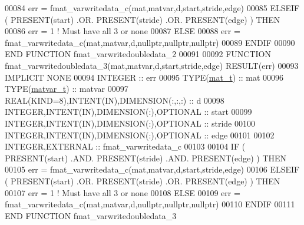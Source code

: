 \begin{DoxyCode}
00084         err = fmat\_varwritedata\_c(mat,matvar,d,start,stride,edge)
00085     \textcolor{keywordflow}{ELSEIF} ( \textcolor{keyword}{PRESENT}(start) .OR. \textcolor{keyword}{PRESENT}(stride) .OR. \textcolor{keyword}{PRESENT}(edge) ) \textcolor{keywordflow}{THEN}
00086         err = 1    \textcolor{comment}{! Must have all 3 or none}
00087     \textcolor{keywordflow}{ELSE}
00088         err = fmat\_varwritedata\_c(mat,matvar,d,nullptr,nullptr,nullptr)
00089 \textcolor{keywordflow}{    ENDIF}
00090 \textcolor{keyword}{END FUNCTION }fmat\_varwritedoubledata\_2
00091 
00092 \textcolor{keyword}{FUNCTION }fmat\_varwritedoubledata\_3(mat,matvar,d,start,stride,edge) \textcolor{keyword}{RESULT}(err)
00093 \textcolor{keywordtype}{IMPLICIT NONE}
00094     \textcolor{keywordtype}{INTEGER}                                  :: err
00095     \textcolor{keywordtype}{TYPE}(\hyperlink{group___m_a_t_gab0fc888f5a5d79943b16284b1f91c2e8}{mat\_t})                              :: mat
00096     \textcolor{keywordtype}{TYPE}(\hyperlink{group___m_a_t_structmatvar__t}{matvar\_t})                           :: matvar
00097     \textcolor{keywordtype}{REAL(KIND=8)},\textcolor{keywordtype}{INTENT(IN)},\textcolor{keywordtype}{DIMENSION(:,:,:)} :: d
00098     \textcolor{keywordtype}{INTEGER},\textcolor{keywordtype}{INTENT(IN)},\textcolor{keywordtype}{DIMENSION(:)},\textcolor{keywordtype}{OPTIONAL} :: start
00099     \textcolor{keywordtype}{INTEGER},\textcolor{keywordtype}{INTENT(IN)},\textcolor{keywordtype}{DIMENSION(:)},\textcolor{keywordtype}{OPTIONAL} :: stride
00100     \textcolor{keywordtype}{INTEGER},\textcolor{keywordtype}{INTENT(IN)},\textcolor{keywordtype}{DIMENSION(:)},\textcolor{keywordtype}{OPTIONAL} :: edge
00101 
00102     \textcolor{keywordtype}{INTEGER},\textcolor{keywordtype}{EXTERNAL}                         :: fmat\_varwritedata\_c
00103 
00104     \textcolor{keywordflow}{IF} ( \textcolor{keyword}{PRESENT}(start) .AND. \textcolor{keyword}{PRESENT}(stride) .AND. \textcolor{keyword}{PRESENT}(edge) ) \textcolor{keywordflow}{THEN}
00105         err = fmat\_varwritedata\_c(mat,matvar,d,start,stride,edge)
00106     \textcolor{keywordflow}{ELSEIF} ( \textcolor{keyword}{PRESENT}(start) .OR. \textcolor{keyword}{PRESENT}(stride) .OR. \textcolor{keyword}{PRESENT}(edge) ) \textcolor{keywordflow}{THEN}
00107         err = 1    \textcolor{comment}{! Must have all 3 or none}
00108     \textcolor{keywordflow}{ELSE}
00109         err = fmat\_varwritedata\_c(mat,matvar,d,nullptr,nullptr,nullptr)
00110 \textcolor{keywordflow}{    ENDIF}
00111 \textcolor{keyword}{END FUNCTION }fmat\_varwritedoubledata\_3

\end{DoxyCode}
